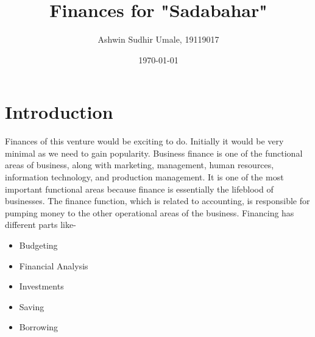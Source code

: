 \documentclass{article}
\title{Finances for "Sadabahar"}
\author{Ashwin Sudhir Umale, 19119017}
\date{\today}
\begin{document}
\maketitle


\section{Introduction}

Finances of this venture would be exciting to do. Initially it would be very minimal as we need to gain popularity.
Business finance is one of the functional areas of business, along with marketing, management, human resources, information technology, and production management. It is one of the most important functional areas because finance is essentially the lifeblood of businesses. The finance function, which is related to accounting, is responsible for pumping money to the other operational areas of the business. 
Financing has different parts like-
\begin{itemize}
    \item Budgeting
    \item Financial Analysis
    \item Investments
    \item Saving 
    \item Borrowing
\end{itemize}
\end{document}
